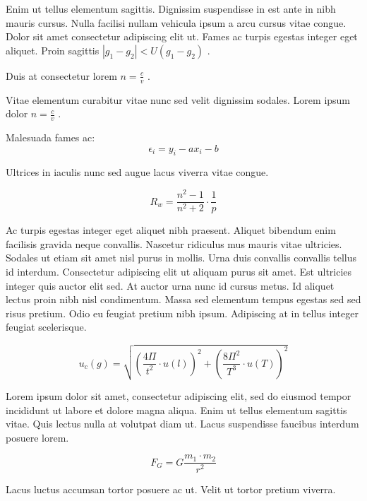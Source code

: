 \documentclass{article}
\begin{document}
Enim ut tellus elementum sagittis. Dignissim suspendisse in est ante in nibh mauris cursus. Nulla facilisi nullam vehicula ipsum a arcu cursus vitae congue. Dolor sit amet consectetur adipiscing elit ut. Fames ac turpis egestas integer eget aliquet. Proin sagittis 
\begin{math}
	|g_1-g_2|<U(g_1-g_2)
\end{math}
.\newline

Duis at consectetur lorem 
$ n=\frac{c}{v} $
.\newline

Vitae elementum curabitur vitae nunc sed velit dignissim sodales. Lorem ipsum dolor 
\( n=\frac{c}{v} \)
.\newline

Malesuada fames ac: 
\[ \epsilon_i=y_i-ax_i-b \]

Ultrices in iaculis nunc sed augue lacus viverra vitae congue.

$$ R_w=\frac{n^2-1}{n^2+2} \cdot \frac{1}{p} $$

Ac turpis egestas integer eget aliquet nibh praesent. Aliquet bibendum enim facilisis gravida neque convallis. Nascetur ridiculus mus mauris vitae ultricies. Sodales ut etiam sit amet nisl purus in mollis. Urna duis convallis convallis tellus id interdum. Consectetur adipiscing elit ut aliquam purus sit amet. Est ultricies integer quis auctor elit sed. At auctor urna nunc id cursus metus. Id aliquet lectus proin nibh nisl condimentum. Massa sed elementum tempus egestas sed sed risus pretium. Odio eu feugiat pretium nibh ipsum. Adipiscing at in tellus integer feugiat scelerisque.

\begin{displaymath}
	u_c(g)=\sqrt{(\frac{4\Pi}{t^2}\cdot u(l))^2+(\frac{8\Pi^2}{T^3}\cdot u(T))^2}
\end{displaymath}

Lorem ipsum dolor sit amet, consectetur adipiscing elit, sed do eiusmod tempor incididunt ut labore et dolore magna aliqua. Enim ut tellus elementum sagittis vitae. Quis lectus nulla at volutpat diam ut. Lacus suspendisse faucibus interdum posuere lorem. 

\begin{equation}
	F_{G}=G\frac{m_1\cdot m_2}{r^2}
\end{equation}

Lacus luctus accumsan tortor posuere ac ut. Velit ut tortor pretium viverra.
\end{document}
